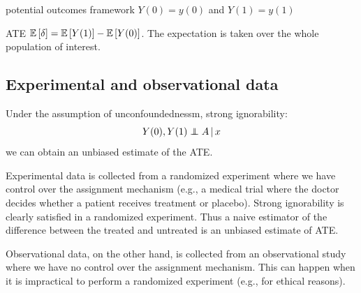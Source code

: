 \PP potential outcomes framework \citep{rubin1974ece} $Y(0) = y(0)$ and $Y(1) = y(1)$

\PP \gls{ATE} $\mathbb{E}\left[\delta\right] = \mathbb{E}\left[Y(1)\right] - \mathbb{E}\left[Y(0)\right]$. The expectation is taken over the whole population of interest. 

\subsection{Experimental and observational data}

\PP Under the assumption of unconfoundednessm, strong ignorability:
\begin{equation*}
Y(0), Y(1) \indpt A \g x
\end{equation*}
we can obtain an unbiased estimate of the \gls{ATE}.

\PP Experimental data is collected from a randomized experiment where we have control over the assignment mechanism (e.g., a medical trial where the doctor decides whether a patient receives treatment or placebo). Strong ignorability is clearly satisfied in a randomized experiment. Thus a naive estimator of the difference between the treated and untreated is an unbiased estimate of \gls{ATE}. 

\PP Observational data, on the other hand, is collected from an observational study where we have no control over the assignment mechanism. This can happen when it is impractical to perform a randomized experiment (e.g., for ethical reasons). 


\PP \citep{rosenbaum1983central}




